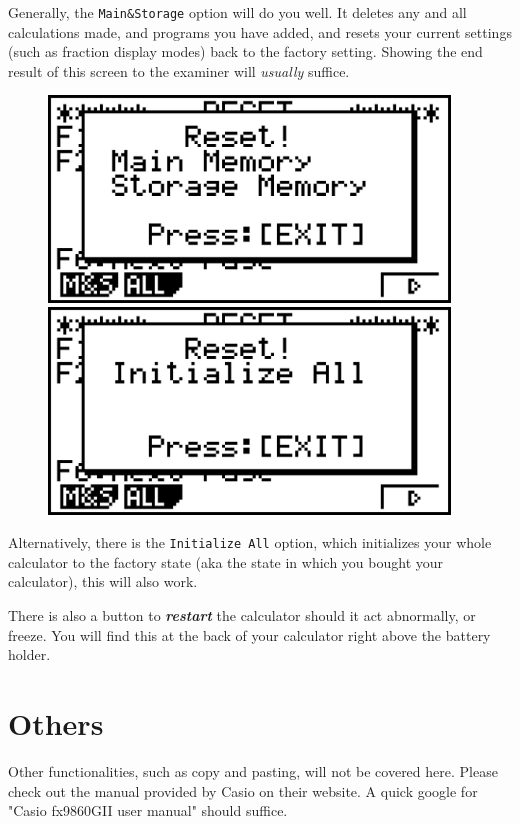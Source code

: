 \documentclass[a5paper]{memoir}
\def\code#1{\texttt{#1}}
\begin{document}
Generally, the \code{Main\&Storage} option will do you well. It deletes any and all calculations made, and programs you have added, and resets your current settings (such as fraction display modes) back to the factory setting. Showing the end result of this screen to the examiner will \textit{usually} suffice.
\begin{figure}[h]
	\begin{minipage}[h]{0.5\textwidth}
			\centering
			\includegraphics[width=0.95\textwidth]{resetms}
	\end{minipage}%
	\begin{minipage}[h]{0.5\textwidth}
			\centering
			\includegraphics[width=0.95\textwidth]{resetinit}
	\end{minipage}
\end{figure}

Alternatively, there is the \code{Initialize All} option, which initializes your whole calculator to the factory state (aka the state in which you bought your calculator), this will also work.

There is also a button to \textbf{\textit{restart}} the calculator should it act abnormally, or freeze. You will find this at the back of your calculator right above the battery holder.

\section{Others}
Other functionalities, such as copy and pasting, will not be covered here. Please check out the manual provided by Casio on their website. A quick google for "Casio fx9860GII user manual" should suffice.
\end{document}
